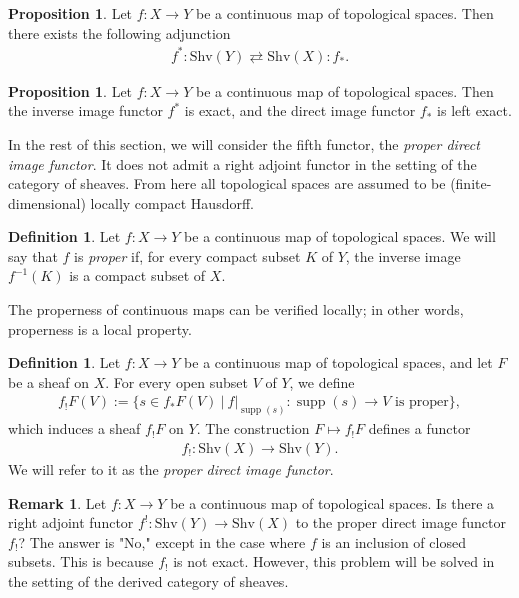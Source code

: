 \documentclass[a4paper,dvipdfmx,11pt,reqno]{amsart}
\DeclareMathOperator{\supp}{supp}
\newcommand{\Shv}{\mathrm{Shv}}
\theoremstyle{definition}
\newtheorem{definition}[theorem]{Definition}
\newtheorem{proposition}[theorem]{Proposition}
\newtheorem{remark}[theorem]{Remark}
\begin{document}
\begin{proposition}
  Let $f : X \to Y$ be a continuous map of topological spaces.
  Then there exists the following adjunction 
  \begin{align*}
    f^{\ast} : \Shv(Y) \rightleftarrows \Shv(X) : f_{\ast}.
  \end{align*}
\end{proposition}

\begin{proposition}
  Let $f : X \to Y$ be a continuous map of topological spaces.
  Then the inverse image functor $f^{\ast}$ is exact, and the direct image functor $f_{\ast}$ is left exact.
\end{proposition}

In the rest of this section, we will consider the fifth functor, the \textit{proper direct image functor}.
It does not admit a right adjoint functor in the setting of the category of sheaves. 
From here all topological spaces are assumed to be (finite-dimensional) locally compact Hausdorff.

\begin{definition}
  Let $f : X \to Y$ be a continuous map of topological spaces.
  We will say that $f$ is \textit{proper} if, for every compact subset $K$ of $Y$, the inverse image $f^{-1}(K)$ is a compact subset of $X$.  
\end{definition}

The properness of continuous maps can be verified locally; 
in other words, properness is a local property.

\begin{definition}
  Let $f : X \to Y$ be a continuous map of topological spaces, and let $F$ be a sheaf on $X$.
  For every open subset $V$ of $Y$, we define 
  \begin{align*}
    f_{!}F(V) := \{s \in f_{\ast}F(V) ~|~ f|_{\supp(s)} : \supp(s) \to V \text{ is proper}\},
  \end{align*}
  which induces a sheaf $f_{!}F$ on $Y$.
  The construction $F \mapsto f_{!}F$ defines a functor 
  \begin{align*}
    f_{!} : \Shv(X) \to \Shv(Y).
  \end{align*}
  We will refer to it as the \textit{proper direct image functor}.
\end{definition}

\begin{remark}
  Let $f : X \to Y$ be a continuous map of topological spaces.
  Is there a right adjoint functor $f^{!} : \Shv(Y) \to \Shv(X)$ to the proper direct image functor $f_{!}$?
  The answer is "No," except in the case where $f$ is an inclusion of closed subsets. 
  This is because $f_{!}$ is not exact.
  However, this problem will be solved in the setting of the derived category of sheaves.
\end{remark}
\end{document}
